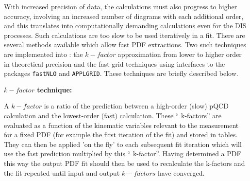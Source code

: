 
With increased precision of data, the calculations must also progress to higher accuracy, involving an increased number of diagrams with each 
additional order, and this translates into computationally demanding 
calculations even for the DIS processes. Such calculations 
are too slow to be used iteratively in a fit.
There are several methods available which allow fast PDF extractions.  
Two such techniques
are implemented into \fitter: the $k-factor$ approximation from lower to higher order in theoretical precision and the fast grid techniques using interfaces to the 
packages \texttt{fastNLO} \rm and \texttt{APPLGRID}. These techniques are briefly described below.  


\begin{description}
\item \bf {$k-factor$ technique:}\rm

A $k-factor$ is a ratio of the prediction between a high-order (slow)
pQCD calculation and the lowest-order (fast) calculation.  These `` k-factors''
are evaluated as a function of the kinematic variables relevant to
 the measurement 
for a fixed PDF (for example the first iteration of the fit) and stored in 
tables. They can then be applied 'on the fly' to each subsequent fit 
iteration which will use the fast prediction multiplied by this `` k-factor''.
Having determined a PDF this way the output PDF fit should then be used to 
recalculate the k-factors and the fit repeated until input and output 
$k-factors$ have converged. 


\end{description}
